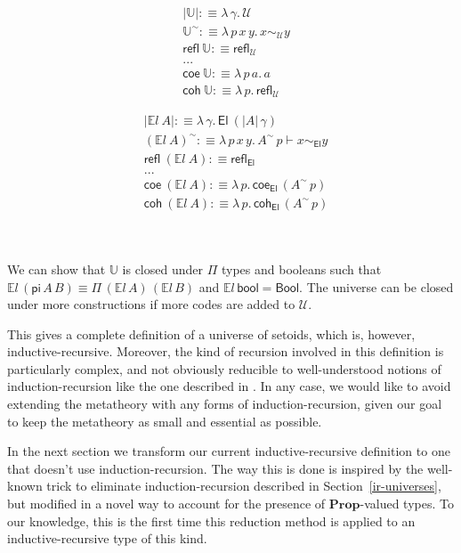\documentclass{easychair}
\newcommand{\setoidU}{\mathcal{U}}
\newcommand{\mProp}{\mathbf{Prop}}
\newcommand{\El}{\textsf{El}}
\newcommand{\Uty}{\mathds{U}}
\newcommand{\EL}{\mathds{E}l}
\newcommand{\reflu}{\textsf{refl}_\setoidU}
\newcommand{\reflel}{\textsf{refl}_\El}
\newcommand{\eqel}[3]{#1 \vdash #2 \sim_\El #3}
\begin{document}
\begin{minipage}{0.5\textwidth}
\begin{align*}
  & | \Uty | :\equiv \lambda\, \gamma . \, \setoidU \\
  & \Uty^\sim :\equiv \lambda \,p\, x\, y . \,x \sim_{\setoidU} y \\
  & \textsf{refl}\ \Uty :\equiv \reflu \\
  & ... \\
  & \textsf{coe}\ \Uty :\equiv \lambda\,p\,a . \, a \\
  & \textsf{coh}\ \Uty :\equiv \lambda\,p . \, \reflu
\end{align*}
\end{minipage}
\begin{minipage}{0.5\textwidth}
\begin{align*}
  & | \EL\ A | :\equiv \lambda \, \gamma . \, \El\ (| A | \,\gamma) \\
  & (\EL\ A)^\sim :\equiv \lambda \, p \, x \, y . \, \eqel{A^\sim\,p}{x}{y} \\
  & \textsf{refl}\ (\EL\ A) :\equiv \reflel \\
  & ... \\
  & \textsf{coe}\ (\EL\ A) :\equiv \lambda\,p.\, \textsf{coe}_{\El}\,(A^\sim\,p) \\
  & \textsf{coh}\ (\EL\ A) :\equiv \lambda\,p.\, \textsf{coh}_{\El}\,(A^\sim\,p)
\end{align*}
\end{minipage}
\\
~
\\

We can show that $\Uty$ is closed under $\Pi$ types and booleans such
that $\EL\,(\mathsf{pi}\,A\,B) \equiv \Pi\,(\EL\,A)\,(\EL\,B)$ and
$\EL\,\mathsf{bool} = \mathsf{Bool}$. The universe can be closed under
more constructions if more codes are added to $\setoidU$.

This gives a complete definition of a universe of setoids, which is, however,
inductive-recursive. Moreover, the kind of recursion involved in this definition
is particularly complex, and not obviously reducible to well-understood notions
of induction-recursion like the one described in \cite{dybjer-setzer}. In any
case, we would like to avoid extending the metatheory with any forms of
induction-recursion, given our goal to keep the metatheory as small and
essential as possible.

In the next section we transform our current inductive-recursive definition to
one that doesn't use induction-recursion.
%
The way this is done is inspired by the well-known trick to eliminate
induction-recursion described in Section~\ref{ir-universes}, but modified in a
novel way to account for the presence of $\mProp$-valued types. To our
knowledge, this is the first time this reduction method is applied to an
inductive-recursive type of this kind.
\end{document}
